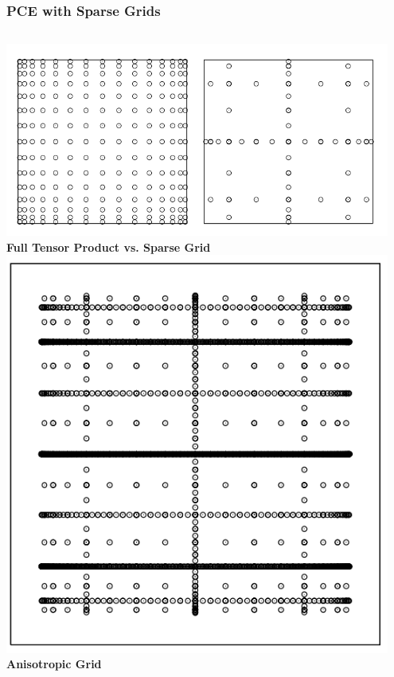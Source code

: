 \documentclass[9pt]{beamer}
\begin{document}
\begin{frame}
\frametitle{PCE with Sparse Grids}
\label{sec-1-5}


\begin{columns}[c]
    \centering
    \includegraphics[width=0.95\textwidth]{SparseGrid1} \\
    \bf{Full Tensor Product vs. Sparse Grid}
    \centering
    \includegraphics[width=0.95\textwidth]{SparseGrid2} \\
    {\bf Anisotropic Grid}
\end{columns}


\end{frame}
\end{document}
